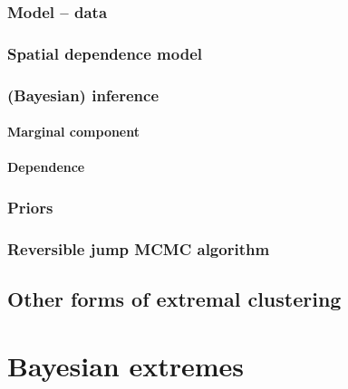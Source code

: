 \documentclass{article}
\begin{document}
\subsubsection{Model -- data}
\subsubsection{Spatial dependence model}
\subsubsection{(Bayesian) inference}
\paragraph{Marginal component}
\paragraph{Dependence}
\subsubsection{Priors}
\subsubsection{Reversible jump MCMC algorithm}

\subsection{Other forms of extremal clustering}

\section{Bayesian extremes}
\end{document}
